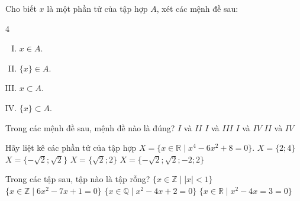 \begin{ex}%
	Cho biết $x$ là một phần tử của tập  hợp $A$, xét các mệnh đề sau:
	\begin{multicols}{4}
		\begin{enumerate}[(I).]
			\item $x\in A$. 
			\item $\{x\}\in A$. 
			\item $x\subset  A$.
			\item $\{x\}\subset  A$.
		\end{enumerate}
	\end{multicols}
	Trong các mệnh đề sau, mệnh đề nào là đúng? 
	\choice 
		{$I$  và $II$}
		{$I$  và $III$}
		{\True  $I$ và $IV$}
		{$II$ và  $IV$}
\end{ex}

\begin{ex}%
	Hãy liệt kê các phần tử của tập hợp $X = \{x \in \mathbb{R} \mid x^4 - 6x^2 + 8 = 0\}$. 
	\choice 
		{$X  = \{2; 4\}$}
		{$X  = \{-\sqrt{2}; \sqrt{2}\}$}
		{$X = \{\sqrt{2};  2\}$}
		{\True $X = \{-\sqrt{2}; \sqrt{2};  -2; 2\}$}
\end{ex}

\begin{ex}%
	Trong các tập  sau, tập nào là tập rỗng?
	 \choice
		{$\{x \in \mathbb{Z} \mid |x| <  1\}$}
		{$\{x \in \mathbb{Z} \mid 6x^2 - 7x + 1 =  0\}$}
		{\True $\{x \in \mathbb{Q} \mid x^2 - 4x  + 2 = 0\}$}
		{$\{x \in \mathbb{R} \mid x^2 - 4x = 3  = 0\}$}
\end{ex}

